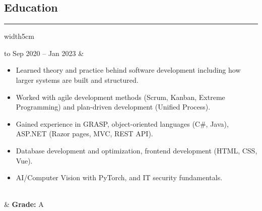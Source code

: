 \documentclass[a4paper]{report}
\def\secsep{\hrule width5cm}
\begin{document}
\subsection*{Education}
\secsep
\vspace{-1em}
\begin{longtabu} to 
    Sep 2020 -- Jan 2023 & 
    \vspace{-1em}
    \begin{itemize}[leftmargin=2em, topsep=-.5em, parsep=0em]
        \item Learned theory and practice behind software development including how larger systems are built and structured.
        \item Worked with agile development methods (Scrum, Kanban, Extreme Programming) and plan-driven development (Unified Process).
        \item Gained experience in GRASP, object-oriented languages (C\#, Java), ASP.NET (Razor pages, MVC, REST API).
        \item Database development and optimization, frontend development (HTML, CSS, Vue).
        \item AI/Computer Vision with PyTorch, and IT security fundamentals.
    \end{itemize}
    \vspace{-.1em}
    \\
    & \textbf{Grade:} A
\end{longtabu}
\end{document}
